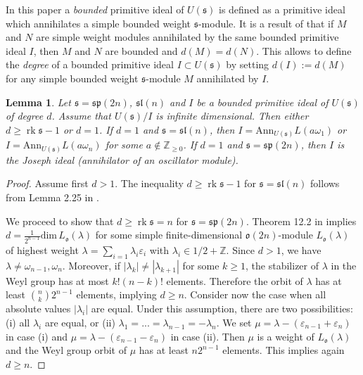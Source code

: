 \documentclass[12pt]{amsart}
\makeatletter
\def\@putname#1#2#3#4{\def\@@ref{#3}\let\old@bf\bf
        \def\bf##1{\old@bf\if?\noexpand##1?{#4}\else##1\fi}%
	#1{#2}%
        \let\bf\old@bf}
\def\@putname#1#2#3#4{\def\@@ref{#3}\let\old@bf\bf	%
	\let\old@reset@font\reset@font			%
        \def\bf##1{\old@bf\if?\noexpand##1?{#4}\else##1\fi}%
	\def\reset@font##1##2{\old@reset@font##1\if?\noexpand##2?{#4}\else##2\fi}#1{#2}%
        \let\bf\old@bf\let\reset@font\old@reset@font}
\let\my@cite=\cite
\def\cite#1{\@putname\my@cite{#1}{\@citeb}{\tiny\rm\@@ref}}
\theoremstyle{plain} %
\numberwithin{equation}{section}
\theoremstyle{definition}
\theoremstyle{remark}
\theoremstyle{plain} %
\newtheorem{lemma}[definition]{Lemma}
\renewcommand{\sp}{\mathfrak{sp}}
\newcommand{\so}{\mathfrak{o}}
\renewcommand{\sl}{\mathfrak{sl}}
\renewcommand{\dim}{\mathrm{dim}}
\newcommand{\Ann}{\mathrm{Ann}}
\newcommand{\Z}{\mathbb{Z}}
\newcommand{\gs}{\mathfrak{s}}
\def\gs{\mathfrak{s}}
\makeatother
\begin{document}
    In this paper a \emph{bounded} primitive ideal of $U(\gs)$ is defined as a primitive ideal which annihilates a simple bounded weight $\gs$-module. It is a result of \cite{PSer3} that if $M$ and $N$ are simple weight modules annihilated by the same bounded primitive ideal $I$, then $M$ and $N$ are bounded and $d(M) = d(N)$. This allows to define the \emph{degree} of a bounded primitive ideal $I \subset U(\gs)$ by setting $d(I) := d(M)$ for any simple bounded weight $\gs$-module $M$ annihilated by $I$.
    

    \begin{lemma}\label{finiterank} Let $\gs=\sp(2n)$, $\sl(n)$ and $I$ be a bounded primitive ideal of $U(\gs)$ of degree $d$. Assume that $U(\gs)/I$ is infinite dimensional. Then either $d\geq  \operatorname{rk}\gs - 1$ or $d=1$. If $d=1$ and $\gs=\sl(n)$, then $I=\Ann_{U(\gs)} L(a\omega_1)$ or
      $I=\Ann_{U(\gs)} L(a\omega_n)$ for some  $a\notin\mathbb Z_{\geq 0}$. If $d=1$ and $\gs=\sp(2n)$, then $I$ is  the Joseph ideal (annihilator of an oscillator module).  %
\end{lemma}
\begin{proof} Assume first  $d>1$. The inequality $d\geq  \operatorname{rk}\gs - 1$   for $\gs=\sl(n)$  follows from Lemma 2.25 in \cite{GrP}. 

We proceed to show that $d \geq  \operatorname{rk}\gs  = n$ for  $\gs=\sp(2n)$. Theorem 12.2 in \cite{Mat} implies $d = \frac{1}{2^{n-1}}\dim \, L_{\so}(\lambda) $ for some simple finite-dimensional $\so (2n)$-module $L_{\so}(\lambda)$ of highest weight $\lambda = \sum_{i=1}\lambda_i \varepsilon_i$ with $\lambda_i \in 1/2 + \Z$. Since $d>1$, we have $\lambda \neq \omega_{n-1}, \omega_{n}$. Moreover, if $|\lambda_k | \neq | \lambda_{k+1} |$ for some $k\geq 1$, the stabilizer of $\lambda$ in the Weyl group has at most $k! (n-k)!$  elements. Therefore the orbit of $\lambda$ has at least $\binom{n}{k}2^{n-1}$ elements, implying $d \geq n$. Consider now the case when all absolute values $|\lambda_i |$ are equal. Under this assumption, there are  two possibilities: (i) all $\lambda_i$ are equal, or (ii) $\lambda_1=...= \lambda_{n-1} = - \lambda_n$. We set $\mu = \lambda - (\varepsilon_{n-1} +\varepsilon_{n})$ in case (i) and $\mu = \lambda - (\varepsilon_{n-1} -\varepsilon_{n})$ in case (ii). Then $\mu$ is a weight of $L_{\so}(\lambda)$ and  the  Weyl group orbit of $\mu$ has at least  $n 2^{n-1}$ elements. This implies again  $d \geq n$.
  \end{proof}  
\end{document}
